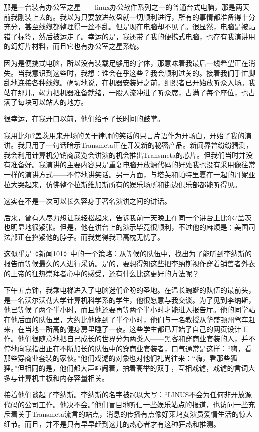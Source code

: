 那是一台装有办公室之星——linux办公软件系列之一的普通台式电脑，那是两天前我刚装上去的。我以为只要放进软盘就一切顺利进行，所有的事情都准备得十分充分，甚至线缆都整理得一丝不乱。但是现在电脑却不见了。很显然，电脑是被贴错了标签，然后被运走了。幸运的是，我还带了我的便携式电脑，也存有我演讲用的幻灯片材料，而且它也有办公室之星系统。

因为是便携式电脑，所以没有装载足够用的字体，那意味着我最后一线希望正在消失。当我意识到这些时，我想：谁会在乎这些？我会顺利过关的。接着我们手忙脚乱地连接各种线缆。确切地说，在机器安装好之前，组织者已开始放听众入场。我站在那儿，竭力把机器准备就绪，一股人流冲进了听众席，占满了每个座位，也占满了每块可以站人的地方。

很幸运，在我开口以前，他们给予了长时间的鼓掌。

我用比尔?盖茨用来开场的关于律师的笑话的只言片语作为开场白，开始了我的演讲。我只用了一句话暗示Transmeta正在开发新的秘密产品。新闻界曾纷纷猜测，我会利用计算机分销商展览会讲演的机会推出Transmeta的芯片。但我们当时并没有准备好。我演讲的主要内容只是重复电脑开放源代码的好处我也没有采用像往常一样的演讲方式——不停地讲笑话。另一方面，与塔芙和帕特里夏在一起的丹妮亚拉大哭起来，仿佛整个拉斯维加斯所有的娱乐场所和街边俱乐部都能听得见。

这实在不是一次可以长久容身于著名演讲之间的讲话。

后来，曾有人尽力想让我轻松起来，告诉我前一天晚上在同一个讲台上比尔?盖茨也明显地很紧张。但是，他在讲台上的演示毕竟很顺利，不过他的麻烦是：美国司法部正在掐紧他的脖子。而我觉得我已高枕无忧了。

 

这似乎是《新闻101》中的一个策略：从等候的队伍中，找出为了能听到李纳斯的报告而等候最久的人进行采访。是的，要想得知这些把李纳斯视作穿着销售者外衣的上帝的狂热崇拜者心中的感受，还有什么比这更好的方法呢？

下午五点钟，我乘电梯进入了电脑迷们企盼的圣地。在温长蜿蜒的队伍的最前头，是一名沃尔沃勒大学计算机科学系的学生，他很愿意与我交谈。为了见到李纳斯，他已等候了两个半小时，而且他还要再等两个半小时才能进入报告厅。他的同学站在他后面的队伍里，大约比他晚到了半个小时，他们与一名教授从华盛顿州驾车赶来，在当地一所高的健身房里睡了一夜。这些学生都已开始了自己的网页设计工作。他们很随意地把自己成长的世界分为两类人——黑客和穿商业套装的人，并不停地向我指出正在不断加长的队伍中的穿商业套装者，口气通常是这样：“嗨，看那些穿商业套装的家伙。”他们戏谑的对象也对他们礼尚往来：“嗨，看那些狐狸。”但相同的是，他们都大声喧闹着，拍着高举的双手，互相戏谑，戏谑的言词大多与计算机主板和内存容量相关。

接着他们谈起了李纳斯。李纳斯的名字被冠以大写：“LINUS不会为任何非开放源代码的公司工作。他决不会。”他们盲目地听信一些娱乐站点的报道，也访问一些充斥着关于Transmeta流言的站点，消息的传播有点像好莱坞女演员爱情生活的惊人细节。而且，并不是只有早早赶到这儿的热心者才有这种狂热和推测。

